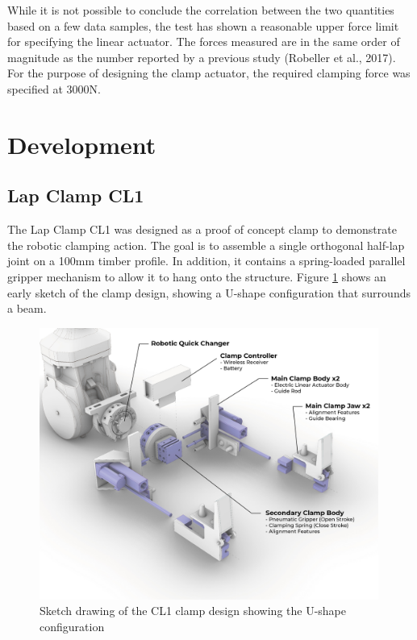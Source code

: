 While it is not possible to conclude the correlation between the two quantities based on a few data samples, the test has shown a reasonable upper force limit for specifying the linear actuator. The forces measured are in the same order of magnitude as the number reported by a previous study (Robeller et al., 2017). For the purpose of designing the clamp actuator, the required clamping force was specified at 3000N. 

\section{Development}
\label{section:exploration-1-development}

\subsection{Lap Clamp CL1}
\label{subsection:exploration-1-lap-clamp-cl1-proof-of-concept}

The Lap Clamp CL1 was designed as a proof of concept clamp to demonstrate the robotic clamping action. The goal is to assemble a single orthogonal half-lap joint on a 100mm timber profile. 
In addition, it contains a spring-loaded parallel gripper mechanism to allow it to hang onto the structure. Figure \ref{fig:cl1-sketch} shows an early sketch of the clamp design, showing a U-shape configuration that surrounds a beam.

\begin{figure}
    \centering
    \includegraphics[width=0.99\textwidth]{images/04-3/cl1-exploded-diagram.jpg}
    \caption{Sketch drawing of the CL1 clamp design showing the U-shape configuration}
    \label{fig:cl1-sketch}
\end{figure}

